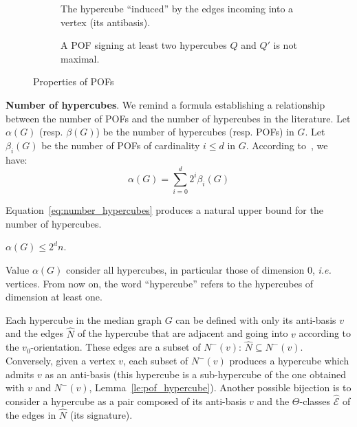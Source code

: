 \documentclass[a4paper,UKenglish,numberwithinsect,cleveref, autoref]{lipics-v2021}
\begin{document}
\begin{figure}[h]
\begin{subfigure}[b]{0.49\columnwidth}
\centering
\scalebox{0.8}{}
\caption{The hypercube ``induced'' by the edges incoming into a vertex (its antibasis).}
\label{subfig:ingoing_edges}
\end{subfigure}
\begin{subfigure}[b]{0.49\columnwidth}
\centering
\scalebox{0.8}{}
\caption{A POF signing at least two hypercubes $Q$ and $Q'$ is not maximal.}
\label{subfig:maximal_pof}
\end{subfigure}
\caption{Properties of POFs}
\label{fig:properties_pofs}
\end{figure} 

\textbf{Number of hypercubes}. We remind a formula establishing a relationship between the number of POFs and the number of hypercubes in the literature. Let $\alpha(G)$ (resp. $\beta(G)$) be the number of hypercubes (resp. POFs) in $G$. Let $\beta_i(G)$ be the number of POFs of cardinality $i \le d$ in $G$. According to~\cite{BaQuSaMa02,Ko09}, we have:
\begin{equation}
\alpha(G) = \sum_{i=0}^d 2^i\beta_i(G)
\label{eq:number_hypercubes}
\end{equation}

Equation~\eqref{eq:number_hypercubes} produces a natural upper bound for the number of hypercubes.

\begin{lemma}
$\alpha(G)\le 2^dn$.
\label{le:number_hypercubes}
\end{lemma}

Value $\alpha(G)$ consider all hypercubes, in particular those of dimension 0, {\em i.e.} vertices. From now on, the word ``hypercube'' refers to the hypercubes of dimension at least one.

Each hypercube in the median graph $G$ can be defined with only its anti-basis $v$ and the edges $\widehat{N}$ of the hypercube that are adjacent and going into $v$ according to the $v_0$-orientation. These edges are a subset of $N^-(v)$: $\widehat{N} \subseteq N^-(v)$. Conversely, given a vertex $v$, each subset of $N^-(v)$ produces a hypercube which admits $v$ as an anti-basis (this hypercube is a sub-hypercube of the one obtained with $v$ and $N^-(v)$, Lemma~\ref{le:pof_hypercube}). Another possible bijection is to consider a hypercube as a pair composed of its anti-basis $v$ and the $\Theta$-classes $\widehat{\mathcal{E}}$ of the edges in $\widehat{N}$ (its signature).
\end{document}
